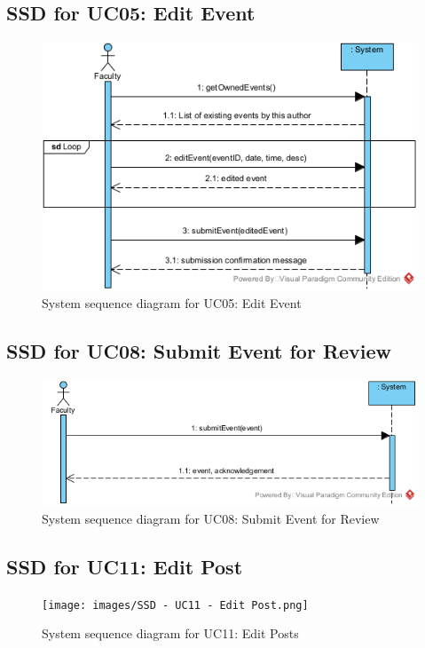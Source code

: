 \documentclass{article}
\begin{document}
\subsection{SSD for UC05: Edit Event}
\begin{figure}[H]
    \centering
    \includegraphics[scale=1.0]{images/SSD - UC05 - Edit Event.png}
    \caption{System sequence diagram for UC05: Edit Event}
    \label{fig:enter-label}
\end{figure}
\subsection{SSD for UC08: Submit Event for Review}
\begin{figure}[H]
    \centering
    \includegraphics[scale=1.0]{images/SSD - UC08 - Submit for review.png}
    \caption{System sequence diagram for UC08: Submit Event for Review}
    \label{fig:enter-label}
\end{figure}
\subsection{SSD for UC11: Edit Post}
\begin{figure}[H]
    \centering
    \texttt{[image: images/SSD - UC11 - Edit Post.png]}
    \caption{System sequence diagram for UC11: Edit Posts}
    \label{fig:enter-label}
\end{figure}
\end{document}
